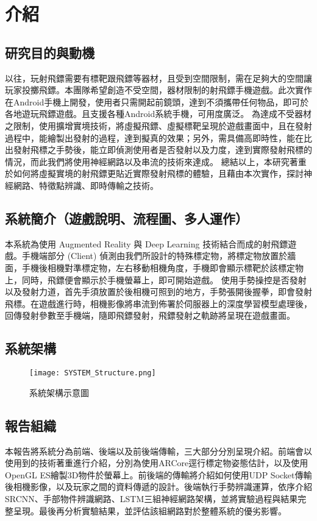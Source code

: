 \chapter{介紹}
\section{研究目的與動機}

以往，玩射飛鏢需要有標靶跟飛鏢等器材，且受到空間限制，需在足夠大的空間讓玩家投擲飛鏢。本團隊希望創造不受空間，器材限制的射飛鏢手機遊戲。此次實作在Android手機上開發，使用者只需開起前鏡頭，達到不須攜帶任何物品，即可於各地遊玩飛鏢遊戲。且支援各種Android系統手機，可用度廣泛。
為達成不受器材之限制，使用擴增實境技術，將虛擬飛鏢、虛擬標靶呈現於遊戲畫面中，且在發射過程中，能繪製出發射的過程，達到擬真的效果；另外，需具備高即時性，能在比出發射飛標之手勢後，能立即偵測使用者是否發射以及力度，達到實際發射飛標的情況，而此我們將使用神經網路以及串流的技術來達成。
總結以上，本研究著重於如何將虛擬實境的射飛鏢更貼近實際發射飛標的體驗，且藉由本次實作，探討神經網路、特徵點辨識、即時傳輸之技術。


\section{系統簡介（遊戲說明、流程圖、多人運作）}

本系統為使用 Augmented Reality 與 Deep Learning 技術結合而成的射飛鏢遊戲。手機端部分 (Client) 偵測由我們所設計的特殊標定物，將標定物放置於牆面，手機後相機對準標定物，左右移動相機角度，手機即會顯示標靶於該標定物上，同時，飛鏢便會顯示於手機螢幕上，即可開始遊戲。
使用手勢操控是否發射以及發射力道，首先手須放置於後相機可照到的地方，手勢張開後握拳，即會發射飛標。在遊戲進行時，相機影像將串流到佈署於伺服器上的深度學習模型處理後，回傳發射參數至手機端，隨即飛鏢發射，飛鏢發射之軌跡將呈現在遊戲畫面。
    

\section{系統架構}
\begin{figure}[H]
    \centering
    \texttt{[image: SYSTEM\_Structure.png]}
    \caption{系統架構示意圖}
    \label{fig:系統架構示意圖}
\end{figure}  
    
\section{報告組織}
本報告將系統分為前端、後端以及前後端傳輸，三大部分分別呈現介紹。前端會以使用到的技術著重進行介紹，分別為使用ARCore逕行標定物姿態估計，以及使用OpenGL ES繪製3D物件於螢幕上。前後端的傳輸將介紹如何使用UDP Socket傳輸後相機影像，以及玩家之間的資料傳遞的設計。後端執行手勢辨識運算，依序介紹SRCNN、手部物件辨識網路、LSTM三組神經網路架構，並將實驗過程與結果完整呈現。最後再分析實驗結果，並評估該組網路對於整體系統的優劣影響。

